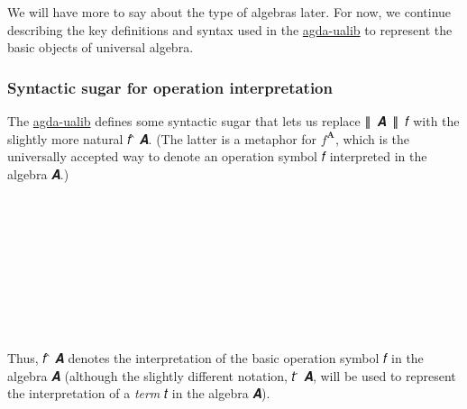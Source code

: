 \documentclass[sigplan,screen]{acmart}
\newcommand{\agdaualib}{\href{https://ualib.org}{agda-ualib}\xspace}
\newcommand{\agdaualib}{\href{anonymizedLink/agda-ualib.html}{agda-ualib}\xspace}
\begin{document}
We will have more to say about the type of algebras later.  For now, we continue describing the key definitions and syntax used in the \agdaualib to represent the basic objects of universal algebra.

\subsubsection{Syntactic sugar for operation interpretation}
The \agdaualib defines some syntactic sugar that lets us replace ∥~𝑨~∥~𝑓 with the slightly more natural 𝑓 ̂ 𝑨. (The latter is a metaphor for \(f^\mathbf{A}\), which is the universally accepted way to denote an operation symbol 𝑓 interpreted in the algebra 𝑨.)
\begin{code}%
\>[0]\AgdaSpace{}%
\AgdaModule{\AgdaUnderscore{}}\AgdaSpace{}%
\AgdaSymbol{\{}\AgdaSpace{}%
\AgdaSymbol{:}\AgdaSpace{}%
\AgdaSpace{}%
\AgdaSpace{}%
\AgdaSymbol{\}}%
\>[30]\<%
\\
%
\\[\AgdaEmptyExtraSkip]%
\>[0][@{}l@{\AgdaIndent{0}}]%
\>[1]\AgdaSpace{}%
\AgdaSymbol{:}\AgdaSpace{}%
\AgdaSymbol{(}\AgdaSpace{}%
\AgdaSymbol{:}\AgdaSpace{}%
\AgdaSpace{}%
\AgdaSpace{}%
\AgdaSymbol{)}\<%
\\
\>[1][@{}l@{\AgdaIndent{0}}]%
\>[2]%
\>[6]\AgdaSymbol{(}\AgdaSpace{}%
\AgdaSymbol{:}\AgdaSpace{}%
\AgdaSpace{}%
\AgdaSpace{}%
\AgdaSymbol{)}\<%
\\
%
\>[2]%
\>[6]\AgdaSymbol{(}\AgdaSpace{}%
\AgdaSpace{}%
\AgdaSpace{}%
%
\>[16]%
\>[19]\AgdaSpace{}%
\AgdaSpace{}%
\AgdaSymbol{)}\AgdaSpace{}%
\AgdaSpace{}%
\AgdaSpace{}%
\AgdaSpace{}%
\<%
\\
%
\\[\AgdaEmptyExtraSkip]%
%
\>[1]\AgdaSpace{}%
\AgdaSpace{}%
\AgdaSpace{}%
\AgdaSymbol{=}\AgdaSpace{}%
\AgdaSpace{}%
\AgdaSpace{}%
\AgdaSpace{}%
\AgdaSymbol{(}\AgdaSpace{}%
\AgdaSpace{}%
\AgdaSpace{}%
\AgdaSymbol{)}\AgdaSpace{}%
\<%
\\
%
\\[\AgdaEmptyExtraSkip]%
%
\>[1]\AgdaSpace{}%
\AgdaSpace{}%
\<%
\end{code}
Thus, 𝑓 ̂ 𝑨 denotes the interpretation of the basic operation symbol 𝑓 in the algebra 𝑨 (although the slightly different notation, 𝑡 ̇ 𝑨, will be used to represent the interpretation of a \emph{term} 𝑡 in the algebra 𝑨).
\end{document}
